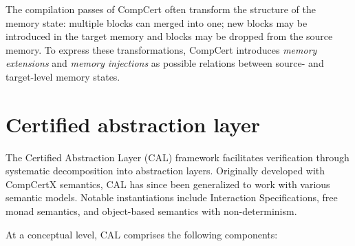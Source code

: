 The compilation passes of CompCert
often transform the structure of the memory state:
multiple blocks can merged into one;
new blocks may be introduced in the target memory
and blocks may be dropped from the source memory.
To express these transformations,
CompCert introduces \emph{memory extensions} and \emph{memory injections}
as possible relations between source- and target-level memory states.



\section{Certified abstraction layer}
\label{sec:bg:cal}

The Certified Abstraction Layer (CAL) framework
facilitates verification through
systematic decomposition into abstraction layers.
Originally developed with CompCertX semantics,
CAL has since been generalized to work with various semantic models.
Notable instantiations include
Interaction Specifications\citep{rbgs-cal},
free monad semantics\citep{thesis},
and object-based semantics with non-determinism\citep{popl22}.

At a conceptual level,
CAL comprises the following components:

